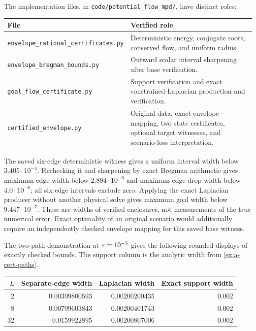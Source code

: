 The implementation files, in \texttt{code/potential\_flow\_mpd/},
have distinct roles:
\begin{center}
\begin{tabular}{@{}p{.45\linewidth}p{.48\linewidth}@{}}
\toprule
File & Verified role\\
\midrule
\texttt{envelope\_rational\_\allowbreak certificates.py} &
Deterministic energy, conjugate roots, conserved flow, and uniform radius.\\
\texttt{envelope\_bregman\_bounds.py} &
Outward scalar interval sharpening after base verification.\\
\texttt{goal\_flow\_certificate.py} &
Support verification and exact constrained-Laplacian production and verification.\\
\texttt{certified\_envelope.py} &
Original data, exact envelope mapping, two state certificates,
optional target witnesses, and scenario-loss interpretation.\\
\bottomrule
\end{tabular}
\end{center}

The saved six-edge deterministic witness gives a uniform interval width
below $3.405\cdot10^{-4}$. Rechecking it and sharpening by exact
Bregman arithmetic gives maximum edge width below
$2.894\cdot10^{-6}$ and maximum edge-drop width below
$4.0\cdot10^{-6}$; all six edge intervals exclude zero.
Applying the exact Laplacian producer without another physical solve
gives maximum goal width below $9.447\cdot10^{-7}$.
These are widths of verified enclosures, not measurements of the
true numerical error. Exact optimality of an original scenario would
additionally require an independently checked envelope mapping for this
saved base witness.

The two-path demonstration at $\varepsilon=10^{-3}$ gives the following
rounded displays of exactly checked bounds. The support column is the
analytic width from \cref{ex:a-cert-paths}.
\begin{center}
\begin{tabular}{@{}rrrr@{}}
\toprule
$L$ & Separate-edge width & Laplacian width & Exact support width\\
\midrule
2 & $0.00399800593$ & $0.00200200435$ & $0.002$\\
8 & $0.00799603843$ & $0.00200401743$ & $0.002$\\
32 & $0.0159922895$ & $0.00200807006$ & $0.002$\\
\bottomrule
\end{tabular}
\end{center}

